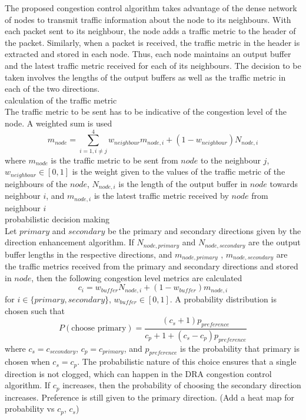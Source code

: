 \documentclass[10pt,conference, draftcls, letterpaper]{IEEEtran}
\newcommand{\rough}[1]{{\color{red} #1}}
\begin{document}
The proposed congestion control algorithm takes advantage of the dense network of nodes to transmit traffic information about the node to its neighbours. With each packet sent to its neighbour, the node adds a traffic metric to the header of the packet. Similarly, when a packet is received, the traffic metric in the header is extracted and stored in each node. Thus, each node maintains an output buffer and the latest traffic metric received for each of its neighbours. The decision to be taken involves the lengths of the output buffers as well as the traffic metric in each of the two directions.\\
\rough{calculation of the traffic metric}\\
The traffic metric to be sent has to be indicative of the congestion level of the node. A weighted sum is used
\begin{equation}
	m_{node} = \sum_{i=1, i\neq j}^4 w_{neighbour}m_{node,i} + (1-w_{neighbour})N_{node, i}
\end{equation}
where $m_{node}$ is the traffic metric to be sent from $node$ to the neighbour $j$, $w_{neighbour}\in [0,1]$ is the weight given to the values of the traffic metric of the neighbours of the $node$, $N_{node,i}$ is the length of the output buffer in $node$ towards neighbour $i$, and $m_{node, i}$ is the latest traffic metric received by $node$ from neighbour $i$ \\
\rough{probabilistic decision making}\\
Let $primary$ and $secondary$ be the primary and secondary directions given by the direction enhancement algorithm. If $N_{node, primary}$ and $N_{node,secondary}$ are the output buffer lengths in the respective directions, and $m_{node, primary}$ , $m_{node, secondary}$ are the traffic metrics received from the primary and secondary directions and stored in $node$, then the following congestion level metrics are calculated
\begin{equation}
	c_{i} = w_{buffer}N_{node,i} + (1-w_{buffer})m_{node, i}
\end{equation}
for $i \in \{primary, secondary\}$, $w_{buffer}\in [0,1]$. A probability distribution is chosen such that 
\begin{equation}
	P(\text{choose primary}) = \dfrac{(c_{s}+1)p_{preference}}{c_{p}+1 + (c_{s} - c_{p})p_{preference}}
\end{equation}
where $c_s = c_{secondary}$, $c_p = c_{primary}$, and $p_{preference}$ is the probability that primary is chosen when $c_s = c_p$. The probabilistic nature of this choice ensures that a single direction is not clogged, which can happen in the DRA congestion control algorithm. If $c_p$ increases, then the probability of choosing the secondary direction increases. Preference is still given to the primary direction. \rough{(Add a heat map for probability vs $c_p$, $c_s$)}
\end{document}
